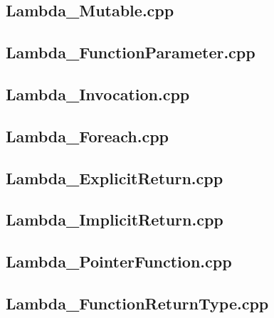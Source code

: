 \documentclass[11pt]{report}
\begin{document}
\begin{appendix}
\subsection{Lambda\_Mutable.cpp}
\label{Lambda_Mutable}


\subsection{Lambda\_FunctionParameter.cpp}
\label{Lambda_FunctionParameter}


\subsection{Lambda\_Invocation.cpp}
\label{Lambda_Invocation}


\subsection{Lambda\_Foreach.cpp}
\label{Lambda_Foreach}


\subsection{Lambda\_ExplicitReturn.cpp}
\label{Lambda_ExplicitReturn}


\subsection{Lambda\_ImplicitReturn.cpp}
\label{Lambda_ImplicitReturn}


\subsection{Lambda\_PointerFunction.cpp}
\label{Lambda_PointerFunction}


\subsection{Lambda\_FunctionReturnType.cpp}
\label{Lambda_FunctionReturnType}



\end{appendix}
\end{document}
